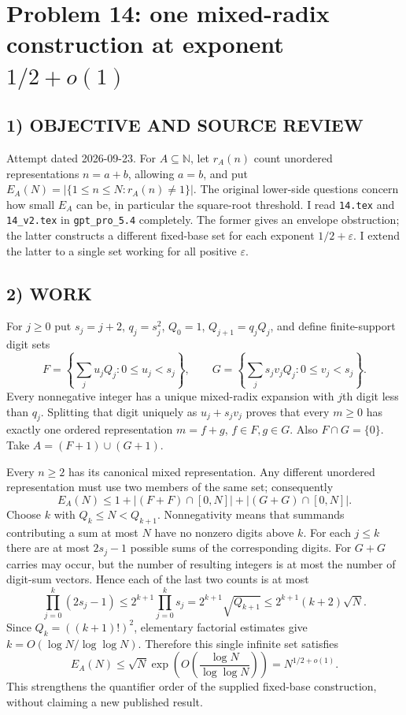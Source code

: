 \section{Problem 14: one mixed-radix construction at exponent $1/2+o(1)$}
\subsection*{1) OBJECTIVE AND SOURCE REVIEW}
Attempt dated 2026-09-23. For $A\subseteq\mathbb N$, let $r_A(n)$ count unordered representations $n=a+b$, allowing $a=b$, and put $E_A(N)=|\{1\le n\le N:r_A(n)\ne1\}|$. The original lower-side questions concern how small $E_A$ can be, in particular the square-root threshold. I read \texttt{14.tex} and \texttt{14\_v2.tex} in \texttt{gpt\_pro\_5.4} completely. The former gives an envelope obstruction; the latter constructs a different fixed-base set for each exponent $1/2+\varepsilon$. I extend the latter to a single set working for all positive $\varepsilon$.
\subsection*{2) WORK}
For $j\ge0$ put $s_j=j+2$, $q_j=s_j^2$, $Q_0=1$, $Q_{j+1}=q_jQ_j$, and define finite-support digit sets
\[
F=\left\{\sum_j u_jQ_j:0\le u_j<s_j\right\},\qquad
G=\left\{\sum_j s_jv_jQ_j:0\le v_j<s_j\right\}.
\]
Every nonnegative integer has a unique mixed-radix expansion with $j$th digit less than $q_j$. Splitting that digit uniquely as $u_j+s_jv_j$ proves that every $m\ge0$ has exactly one ordered representation $m=f+g$, $f\in F,g\in G$. Also $F\cap G=\{0\}$. Take $A=(F+1)\cup(G+1)$.

Every $n\ge2$ has its canonical mixed representation. Any different unordered representation must use two members of the same set; consequently
\[
E_A(N)\le1+|(F+F)\cap[0,N]|+|(G+G)\cap[0,N]|.
\]
Choose $k$ with $Q_k\le N<Q_{k+1}$. Nonnegativity means that summands contributing a sum at most $N$ have no nonzero digits above $k$. For each $j\le k$ there are at most $2s_j-1$ possible sums of the corresponding digits. For $G+G$ carries may occur, but the number of resulting integers is at most the number of digit-sum vectors. Hence each of the last two counts is at most
\[
\prod_{j=0}^k(2s_j-1)\le2^{k+1}\prod_{j=0}^ks_j
=2^{k+1}\sqrt{Q_{k+1}}
\le2^{k+1}(k+2)\sqrt N.
\]
Since $Q_k=((k+1)!)^2$, elementary factorial estimates give $k=O(\log N/\log\log N)$. Therefore this single infinite set satisfies
\[
E_A(N)\le\sqrt N\exp\!\left(O\left(\frac{\log N}{\log\log N}\right)\right)=N^{1/2+o(1)}.
\]
This strengthens the quantifier order of the supplied fixed-base construction, without claiming a new published result.
